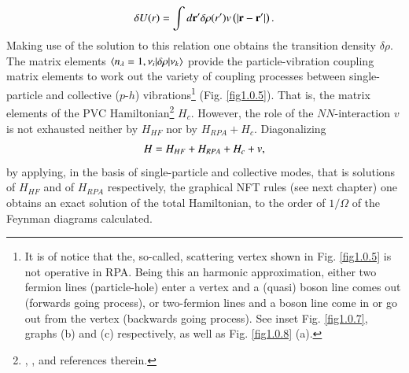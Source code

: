 \begin{align}\label{eq1.0.19}
\delta U(r)=\int d\mathbf r' \delta \rho(r')v\left(|\mathbf r-\mathbf r'|\right). \idx{Surface vibrations!self consistent condition}
\end{align}
Making use  of the solution to this relation  one obtains the transition density $\delta\rho$. The matrix elements $\langle {n_\lambda=1, \nu_i|\delta\rho|\nu_k} \rangle$ provide the  particle-vibration coupling matrix elements to work out the variety of coupling processes between single-particle and collective ($p$-$h$) vibrations\footnote{It is of notice that the, so-called, scattering vertex shown in Fig. \ref{fig1.0.5} is not operative in RPA. Being this an harmonic approximation, either two fermion lines (particle-hole) enter a vertex and a (quasi) boson line comes out (forwards going process), or two-fermion lines and a boson line come in or go out from the vertex (backwards going process). See inset Fig. \ref{fig1.0.7}, graphs (b) and (c) respectively, as well as Fig. \ref{fig1.0.8} (a).} (Fig. \ref{fig1.0.5}). That is, the matrix elements of the PVC Hamiltonian\footnote{\label{f14C1}\cite{Mottelson:68}, \cite{Mottelson:67,Hamamoto:69,Hamamoto:70,Hamamoto:70b,Hamamoto:77,Bes:71,Broglia:71b,Broglia:71c,Flynn:71}, and references therein.}  $H_c$. However, the role of the $NN$-interaction $v$ is not exhausted neither by $H_{HF}$ nor by $H_{RPA}+H_c$. Diagonalizing 
\begin{align}\label{eq1.0.19b}
H=H_{HF}+H_{RPA}+H_c+v, \idx{Four-point vertices}
\end{align}
by applying,  in the basis of single-particle and collective modes, that is solutions of $H_{HF}$ and of $H_{RPA}$ respectively, the graphical  NFT rules  (see next chapter) one obtains an exact solution of the total Hamiltonian, to the order of $1/\Omega$ of the Feynman diagrams calculated. 
